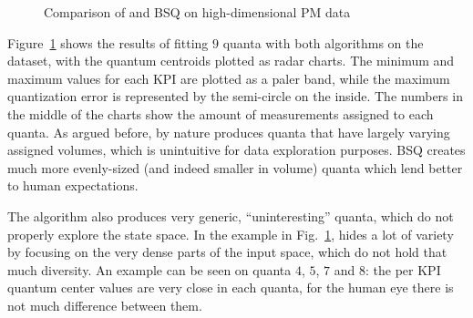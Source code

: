 			\begin{figure}[ht]
				\centering
				\caption[\kmeans{} and BSQ comparison on high-dimensional data]{Comparison of \kmeans{} and BSQ on high-dimensional PM data}
				\label{fig:kmeansbeansmultidim}
			\end{figure}
			
			Figure~\ref{fig:kmeansbeansmultidim} shows the results of fitting $9$ quanta with both algorithms on the dataset, with the quantum centroids plotted as radar charts.
			The minimum and maximum values for each \ac{KPI} are plotted as a paler band, while the maximum quantization error is represented by the semi-circle on the inside.
			The numbers in the middle of the charts show the amount of measurements assigned to each quanta.
			As argued before, \kmeans{} by nature produces quanta that have largely varying assigned volumes, which is unintuitive for data exploration purposes.
			\ac{BSQ} creates much more evenly-sized (and indeed smaller in volume) quanta which lend better to human expectations.
			
			The \kmeans{} algorithm also produces very generic, ``uninteresting'' quanta, which do not properly explore the state space.
			In the example in Fig.~\ref{fig:kmeansbeansmultidim}, \kmeans{} hides a lot of variety by focusing on the very dense parts of the input space, which do not hold that much diversity.
			An example can be seen on quanta $4$, $5$, $7$ and $8$: the per \ac{KPI} quantum center values are very close in each quanta, for the human eye there is not much difference between them.
			
